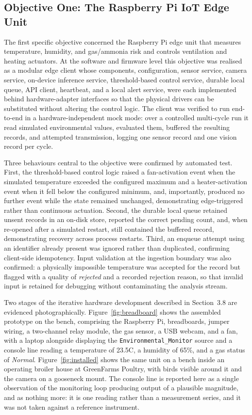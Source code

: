 \documentclass[12pt,a4paper]{report}
\begin{document}
\subsection{Objective One: The Raspberry Pi IoT Edge Unit}

The first specific objective concerned the Raspberry Pi edge unit that measures temperature, humidity, and gas/ammonia risk and controls ventilation and heating actuators. At the software and firmware level this objective was realised as a modular edge client whose components, configuration, sensor service, camera service, on-device inference service, threshold-based control service, durable local queue, API client, heartbeat, and a local alert service, were each implemented behind hardware-adapter interfaces so that the physical drivers can be substituted without altering the control logic. The client was verified to run end-to-end in a hardware-independent mock mode: over a controlled multi-cycle run it read simulated environmental values, evaluated them, buffered the resulting records, and attempted transmission, logging one sensor record and one vision record per cycle.

Three behaviours central to the objective were confirmed by automated test. First, the threshold-based control logic raised a fan-activation event when the simulated temperature exceeded the configured maximum and a heater-activation event when it fell below the configured minimum, and, importantly, produced no further event while the state remained unchanged, demonstrating edge-triggered rather than continuous actuation. Second, the durable local queue retained unsent records in an on-disk store, reported the correct pending count, and, when re-opened after a simulated restart, still contained the buffered record, demonstrating recovery across process restarts. Third, an enqueue attempt using an identifier already present was ignored rather than duplicated, confirming client-side idempotency. Input validation at the ingestion boundary was also confirmed: a physically impossible temperature was accepted for the record but flagged with a quality of \emph{rejected} and a recorded rejection reason, so that invalid input is retained for debugging without contaminating the analysis stream.

Two stages of the iterative hardware development described in Section~3.8 are evidenced photographically. Figure~\ref{fig:breadboard} shows the assembled prototype on the bench, comprising the Raspberry Pi, breadboards, jumper wiring, a two-channel relay module, the gas sensor, a USB webcam, and a fan, with a laptop alongside displaying the \texttt{Environmental\_Monitor} source and a console line reading a temperature of 23.5\textdegree C, a humidity of 65\%, and a gas status of \emph{Normal}. Figure~\ref{fig:installed} shows the same unit on a bench inside an operating broiler house at GreenFarms Poultry, with birds visible around it and the camera on a gooseneck mount. The console line is reported here as a single observation of the monitoring loop producing output of a plausible magnitude, and as nothing more: it is one reading rather than a measurement series, and it was not taken against a reference instrument.
\end{document}
